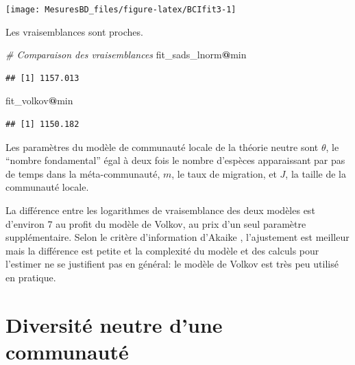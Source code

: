 \documentclass[
  11pt,
  french,
  a4paper,
  extrafontsizes,onecolumn,openright
  ]{memoir}
\newenvironment{Shaded}{\begin{snugshade}}{\end{snugshade}}
\newcommand{\CommentTok}[1]{\textcolor[rgb]{0.56,0.35,0.01}{\textit{#1}}}
\newcommand{\NormalTok}[1]{#1}
\newcommand{\OperatorTok}[1]{\textcolor[rgb]{0.81,0.36,0.00}{\textbf{#1}}}
\begin{document}
\begin{center}\texttt{[image: MesuresBD\_files/figure-latex/BCIfit3-1]} \end{center}

\normalsize

Les vraisemblances sont proches.

\scriptsize

\begin{Shaded}
\begin{Highlighting}[]
\CommentTok{# Comparaison des vraisemblances}
\NormalTok{fit_sads_lnorm}\OperatorTok{@}\NormalTok{min}
\end{Highlighting}
\end{Shaded}

\begin{verbatim}
## [1] 1157.013
\end{verbatim}

\begin{Shaded}
\begin{Highlighting}[]
\NormalTok{fit_volkov}\OperatorTok{@}\NormalTok{min}
\end{Highlighting}
\end{Shaded}

\begin{verbatim}
## [1] 1150.182
\end{verbatim}

\normalsize

Les paramètres du modèle de communauté locale de la théorie neutre sont \(\theta\), le \enquote{nombre fondamental} égal à deux fois le nombre d'espèces apparaissant par pas de temps dans la méta-communauté, \(m\), le taux de migration, et \(J\), la taille de la communauté locale.

La différence entre les logarithmes de vraisemblance des deux modèles est d'environ 7 au profit du modèle de Volkov, au prix d'un seul paramètre supplémentaire.
Selon le critère d'information d'Akaike \autocite[AIC:][]{Akaike1998}, l'ajustement est meilleur mais la différence est petite et la complexité du modèle et des calculs pour l'estimer ne se justifient pas en général: le modèle de Volkov est très peu utilisé en pratique.

\hypertarget{part-diversituxe9-neutre-dune-communautuxe9}{%
\part{Diversité neutre d'une communauté}\label{part-diversituxe9-neutre-dune-communautuxe9}}
\end{document}
